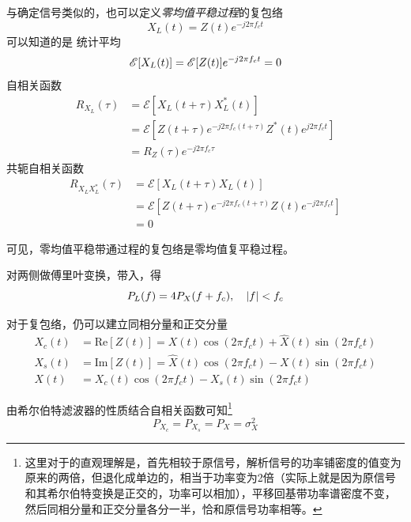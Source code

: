     与确定信号类似的，也可以定义\emph{零均值平稳过程}的复包络
    \begin{equation}
        X_L(t)=Z(t)e^{-j2\pi f_ct}
    \end{equation}
    可以知道的是
    统计平均
    \begin{equation}
        \mathscr{E}[X_L(t)]=\mathscr{E}[Z(t)]e^{-j2\pi f_ct}=0\\
    \end{equation}
    自相关函数
    \begin{equation}\label{eq:fubaoluozixiangguan}
        \begin{split}
            R_{X_L}(\tau)&=\mathscr{E}[X_L(t+\tau)X^*_L(t)]\\
                         &=\mathscr{E}[Z(t+\tau)e^{-j2\pi f_c(t+\tau)}Z^*(t)e^{j2\pi f_ct}]\\
                         &=R_Z(\tau)e^{-j2\pi f_c\tau}
        \end{split}
    \end{equation}
    共轭自相关函数
    \begin{equation}
        \begin{split}
            R_{X_LX_L^*}(\tau)  &=\mathscr{E}[X_L(t+\tau)X_L(t)]\\
                                &=\mathscr{E}[Z(t+\tau)e^{-j2\pi f_c(t+\tau)}Z(t)e^{-j2\pi f_ct}]\\
                                &=0
        \end{split}
    \end{equation}

    可见，零均值平稳带通过程的复包络是零均值复平稳过程。

    对两侧做傅里叶变换，带入，得
    \begin{equation}
        P_L(f)=4P_X(f+f_c),\hspace{1em}\left\vert f \right\vert<f_c
    \end{equation}

    对于复包络，仍可以建立同相分量和正交分量
    \begin{align}
        X_c(t)&=\text{Re}[Z(t)]=X(t)\cos(2\pi f_ct)+\hat{X}(t)\sin(2\pi f_ct)\\
        X_s(t)&=\text{Im}[Z(t)]=\hat{X}(t)\cos(2\pi f_ct)-X(t)\sin(2\pi f_ct)\\
        X(t)&=X_c(t)\cos(2\pi f_ct)-X_s(t)\sin(2\pi f_ct)\label{eq:x_x_c_x_s}
    \end{align}

    由希尔伯特滤波器的性质结合自相关函数可知\footnote{这里对于的直观理解是，首先相较于原信号，解析信号的功率铺密度的值变为原来的两倍，但退化成单边的，相当于功率变为2倍（实际上就是因为原信号和其希尔伯特变换是正交的，功率可以相加），平移回基带功率谱密度不变，然后同相分量和正交分量各分一半，恰和原信号功率相等。}
    \begin{equation}
        P_{X_c}=P_{X_s}=P_{X}=\sigma_X^2
    \end{equation}

